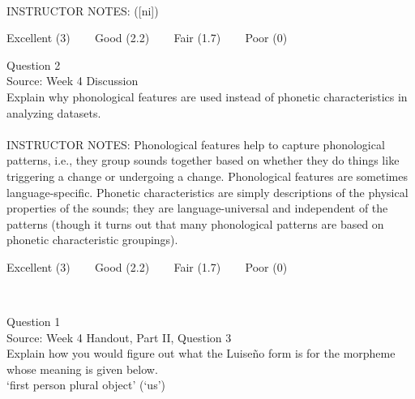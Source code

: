 \documentclass[12pt]{article}
\begin{document}
~\\
INSTRUCTOR NOTES: ([ni])


\vfill
Excellent (3) ~~~ Good (2.2) ~~~ Fair (1.7) ~~~ Poor (0)
\newpage

{\large Question 2}\\

Source: Week 4 Discussion\\

Explain why phonological features are used instead of phonetic characteristics in analyzing datasets.\\


~\\
INSTRUCTOR NOTES: Phonological features help to capture phonological patterns, i.e., they group sounds together based on whether they do things like triggering a change or undergoing a change. Phonological features are sometimes language-specific. Phonetic characteristics are simply descriptions of the physical properties of the sounds; they are language-universal and independent of the patterns (though it turns out that many phonological patterns are based on phonetic characteristic groupings).


\vfill
Excellent (3) ~~~ Good (2.2) ~~~ Fair (1.7) ~~~ Poor (0)
\newpage

\begin{center}
\textbf{{\color{red}{\HUGE END OF EXAM}}}\\

\end{center}
\newpage

\begin{center}
\textbf{{\color{blue}{\HUGE START OF EXAM\\}}}

\textbf{{\color{blue}{\HUGE Student ID: 16758\\}}}

\textbf{{\color{blue}{\HUGE 9:40\\}}}

\end{center}
\newpage

{\large Question 1}\\

Source: Week 4 Handout, Part II, Question 3\\

Explain how you would figure out what the Luiseño form is for the morpheme whose meaning is given below.\\

‘first person plural object’ (‘us’)
\end{document}
